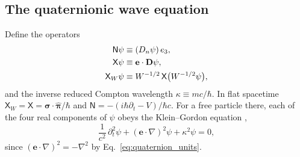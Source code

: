 \documentclass[aps,prd,onecolumn,tightenlines,nofootinbib,notitlepage,11pt,floatfix]{revtex4-2}
\theoremstyle{indentedtheorem}
\begin{document}
\subsection{The quaternionic wave equation}
\label{sec:wave_equation}

Define the operators
\begin{align}
    \mathsf{N}\psi &\equiv (D_n\psi)\,e_3 , \notag\\
    \mathsf{X}\psi &\equiv \mathbf{e}\cdot\mathbf{D}\psi , \notag\\
    \mathsf{X}_W\psi &\equiv W^{-1/2}\,\mathsf{X}\big(W^{-1/2}\psi\big) ,
    \label{eq:NX_operators}
\end{align}
and the inverse reduced Compton wavelength $\kappa\equiv mc/\hbar$. In flat spacetime $\mathsf{X}_W=\mathsf{X}=\boldsymbol{\sigma}\cdot\hat{\boldsymbol{\pi}}/\hbar$ and $\mathsf{N}=-(i\hbar\partial_t-V)/\hbar c$. For a free particle there, each of the four real components of $\psi$ obeys the Klein--Gordon equation \citep{Klein1926Quantum,Gordon1926Compton},
\begin{equation}
    \frac{1}{c^2}\,\partial_t^2\psi + (\mathbf{e}\cdot\nabla)^2\psi + \kappa^2\psi = 0 ,
    \label{eq:klein_gordon}
\end{equation}
since $(\mathbf{e}\cdot\nabla)^2=-\nabla^2$ by Eq.~\eqref{eq:quaternion_units}.
\end{document}
